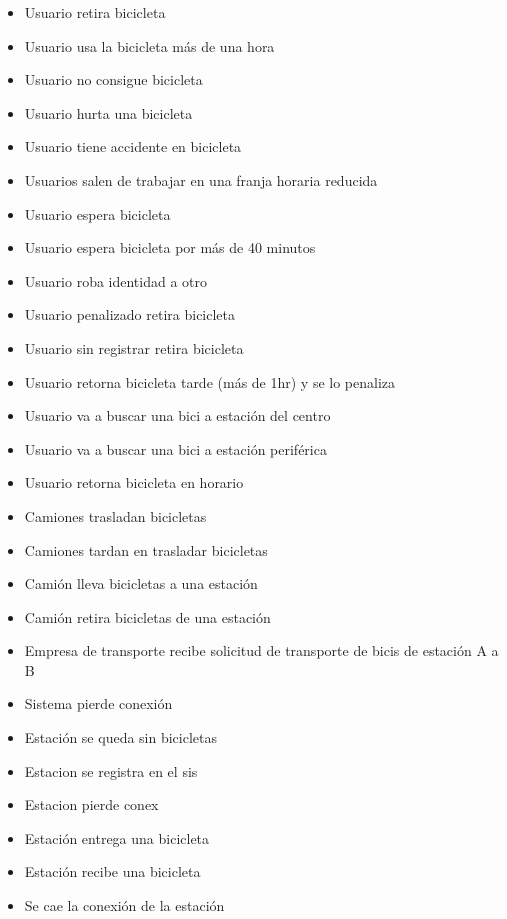 \documentclass[a4paper, 10pt, twoside]{article}
\begin{document}
\begin{multicols}{2}
  \begin{itemize}
    \item Usuario retira bicicleta	
    \item Usuario usa la bicicleta más de una hora
    \item Usuario no consigue bicicleta
    \item Usuario hurta una bicicleta	
    \item Usuario tiene accidente en bicicleta
    \item Usuarios salen de trabajar en una franja horaria reducida	
    \item Usuario espera bicicleta
    \item Usuario espera bicicleta por más de 40 minutos 
    \item Usuario roba identidad a otro
    \item Usuario penalizado retira bicicleta	
    \item Usuario sin registrar retira bicicleta
    \item Usuario retorna bicicleta tarde (más de 1hr) y se lo penaliza
    \item Usuario va a buscar una bici a estación del centro
    \item Usuario va a buscar una bici a estación periférica
    \item Usuario retorna bicicleta en horario 
    \item Camiones trasladan bicicletas
    \item Camiones tardan en trasladar bicicletas
    \item Camión lleva bicicletas a una estación
    \item Camión retira bicicletas de una estación
    \item Empresa de transporte recibe solicitud de transporte de bicis de estación A a B 
    \item Sistema pierde conexión
    \item Estación se queda sin bicicletas
    \item Estacion se registra en el sis
    \item Estacion pierde conex
    \item Estación entrega una bicicleta 
    \item Estación recibe una bicicleta 
    \item Se cae la conexión de la estación
  \end{itemize}
\end{multicols}
\end{document}
